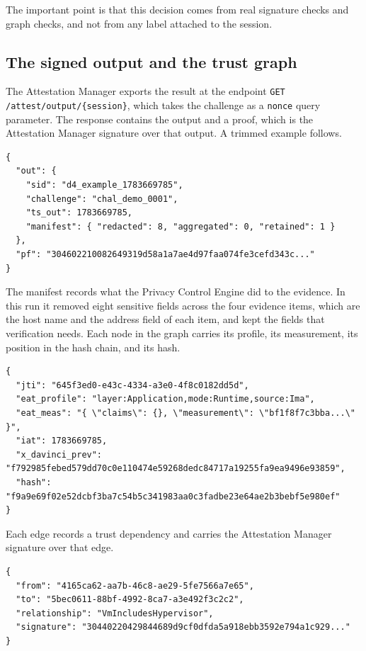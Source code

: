 \documentclass[11pt,a4paper]{article}
\begin{document}
The important point is that this decision comes from real signature checks and
graph checks, and not from any label attached to the session.

\subsection{The signed output and the trust graph}

The Attestation Manager exports the result at the endpoint
\texttt{GET /attest/output/\{session\}}, which takes the challenge as a
\texttt{nonce} query parameter. The response contains the output and a proof,
which is the Attestation Manager signature over that output. A trimmed example
follows.

\begin{lstlisting}
{
  "out": {
    "sid": "d4_example_1783669785",
    "challenge": "chal_demo_0001",
    "ts_out": 1783669785,
    "manifest": { "redacted": 8, "aggregated": 0, "retained": 1 }
  },
  "pf": "304602210082649319d58a1a7ae4d97faa074fe3cefd343c..."
}
\end{lstlisting}

The manifest records what the Privacy Control Engine did to the evidence. In this
run it removed eight sensitive fields across the four evidence items, which are
the host name and the address field of each item, and kept the fields that
verification needs. Each node in the graph carries its profile, its measurement,
its position in the hash chain, and its hash.

\begin{lstlisting}
{
  "jti": "645f3ed0-e43c-4334-a3e0-4f8c0182dd5d",
  "eat_profile": "layer:Application,mode:Runtime,source:Ima",
  "eat_meas": "{ \"claims\": {}, \"measurement\": \"bf1f8f7c3bba...\" }",
  "iat": 1783669785,
  "x_davinci_prev": "f792985febed579dd70c0e110474e59268dedc84717a19255fa9ea9496e93859",
  "hash": "f9a9e69f02e52dcbf3ba7c54b5c341983aa0c3fadbe23e64ae2b3bebf5e980ef"
}
\end{lstlisting}

Each edge records a trust dependency and carries the Attestation Manager
signature over that edge.

\begin{lstlisting}
{
  "from": "4165ca62-aa7b-46c8-ae29-5fe7566a7e65",
  "to": "5bec0611-88bf-4992-8ca7-a3e492f3c2c2",
  "relationship": "VmIncludesHypervisor",
  "signature": "30440220429844689d9cf0dfda5a918ebb3592e794a1c929..."
}
\end{lstlisting}
\end{document}
